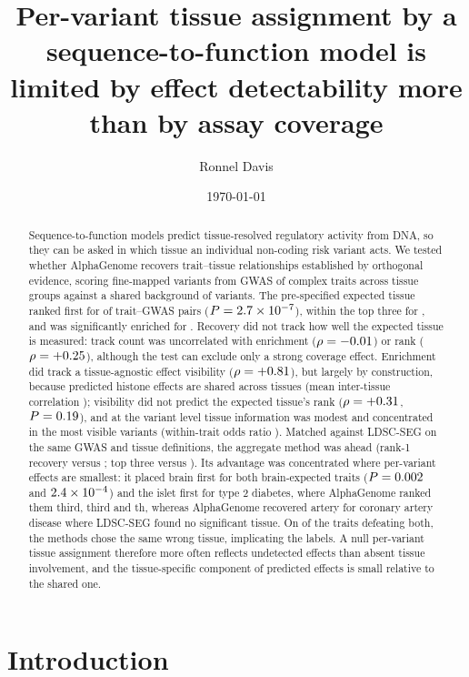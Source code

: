 \documentclass[11pt]{article}
\title{\bfseries Per-variant tissue assignment by a sequence-to-function model is
limited by effect detectability more than by assay coverage}
\author[1]{Ronnel Davis}
\affil[1]{\small Guidenco Inc., Delaware, USA. Correspondence: \texttt{ronnel@onvo.ai}}
\date{\today}
\begin{document}
\maketitle

\begin{abstract}
\noindent
Sequence-to-function models predict tissue-resolved regulatory activity from DNA, so they
can be asked in which tissue an individual non-coding risk variant acts. We tested whether
AlphaGenome recovers trait--tissue relationships established by orthogonal evidence,
scoring fine-mapped variants from \NTRAITS{} GWAS of \NUNIQUE{} complex traits across
\NTISSUE{} tissue groups against a shared background of \NBG{} variants. The pre-specified
expected tissue ranked first for \NHITONE{} of \NTRAITS{} trait--GWAS pairs
($P = 2.7\times 10^{-7}$), within the top three for \NHITTHREE{}, and was significantly enriched
for \NSIG{}. Recovery did not track how well the expected tissue is measured: track count
was uncorrelated with enrichment ($\rho = -0.01$) or rank ($\rho = +0.25$),
although the test can exclude only a strong coverage effect. Enrichment did track a
tissue-agnostic effect visibility ($\rho = +0.81$), but largely by construction, because
predicted histone effects are shared across tissues (mean inter-tissue correlation
\INTERTISSUE{}); visibility did not predict the expected tissue's rank
($\rho = +0.31$, $P = 0.19$), and at the variant level tissue information was
modest and concentrated in the most visible variants (within-trait odds ratio \ORTOPQ{}).
Matched against LDSC-SEG on the same \NMATCH{} GWAS and tissue definitions, the aggregate
method was ahead (rank-1 recovery \LDONE{} versus \AGONE{}; top three \LDTHREE{} versus
\AGTHREE{}). Its advantage was concentrated where per-variant effects are smallest: it
placed brain first for both brain-expected traits ($P = 0.002$ and $2.4\times 10^{-4}$) and the
islet first for type 2 diabetes, where AlphaGenome ranked them third, third and
\TWODAGRANK{}th, whereas AlphaGenome recovered artery for coronary artery disease where
LDSC-SEG found no significant tissue. On \NSAMEWRONG{} of the \NBOTHMISS{} traits
defeating both, the methods chose the same wrong tissue, implicating the labels. A null
per-variant tissue assignment therefore more often reflects undetected effects than absent
tissue involvement, and the tissue-specific component of predicted effects is small
relative to the shared one.
\end{abstract}

\section{Introduction}
\end{document}
